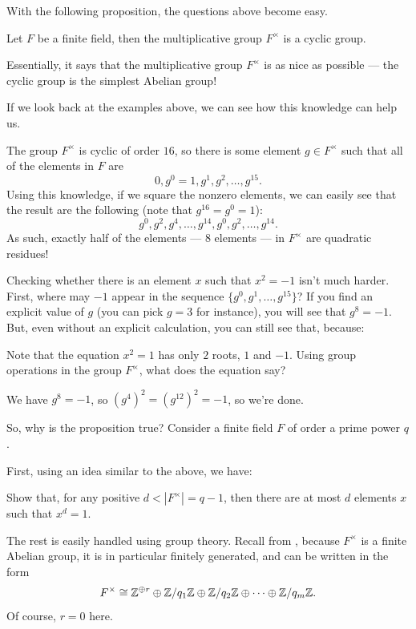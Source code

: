 With the following proposition, the questions above become easy.
\begin{proposition}
	Let $F$ be a finite field, then the multiplicative group $F^\times$ is a cyclic group.
\end{proposition}

Essentially, it says that the multiplicative group $F^\times$ is as nice as possible --- the cyclic
group is the simplest Abelian group!

If we look back at the examples above, we can see how this knowledge can help us.

\begin{example}
The group $F^\times$ is cyclic of order $16$, so there is some element $g \in F^\times$ such
that all of the elements in $F$ are
\[ 0, g^0 = 1, g^1, g^2, \dots, g^{15}.  \]
Using this knowledge, if we square the nonzero elements, we can easily see that the result are the
following (note that $g^{16} = g^0 = 1$):
\[ g^0, g^2, g^4, \dots, g^{14}, g^0, g^2, \dots, g^{14}.  \]
As such, exactly half of the elements --- 8 elements --- in $F^\times$ are quadratic residues!

Checking whether there is an element $x$ such that $x^2 = -1$ isn't much harder.
First, where may $-1$ appear in the sequence $\{g^0, g^1, \dots, g^{15} \}$?
If you find an explicit value of $g$ (you can pick $g = 3$ for instance), you will see that $g^8 =
-1$. But, even without an explicit calculation, you can still see that, because:
\begin{ques}
	Note that the equation $x^2 = 1$ has only $2$ roots, $1$ and $-1$.
	Using group operations in the group $F^\times$, what does the equation say?
\end{ques}
We have $g^8 = -1$, so $(g^4)^2 = (g^{12})^2 = -1$, so we're done.
\end{example}

So, why is the proposition true? Consider a finite field $F$ of order a prime power $q$.

First, using an idea similar to the above, we have:
\begin{ques}
	Show that, for any positive $d < |F^\times| = q-1$, then there are at most $d$ elements $x$ such
	that $x^d = 1$.
\end{ques}
The rest is easily handled using group theory.
Recall from , because $F^\times$ is a finite Abelian group, it is
in particular finitely generated, and can be written in the form
\[ F^\times \cong \mathbb Z^{\oplus r} \oplus \mathbb Z/q_1\mathbb Z \oplus \mathbb Z/q_2\mathbb Z \oplus
	\dots \oplus \mathbb Z/q_m\mathbb Z.  \]
Of course, $r = 0$ here.

